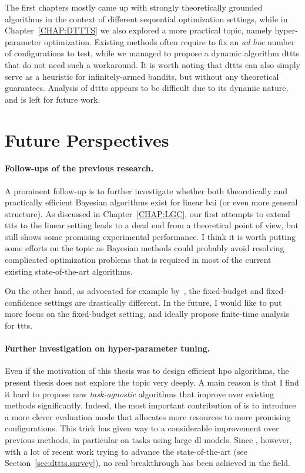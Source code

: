 The first chapters mostly came up with strongly theoretically grounded algorithms in the context of different sequential optimization settings, while in Chapter~\ref{CHAP:DTTTS} we also explored a more practical topic, namely hyper-parameter optimization. Existing methods often require to fix an \emph{ad hoc} number of configurations to test, while we managed to propose a dynamic algorithm \gls{dttts} that do not need such a workaround. It is worth noting that \gls{dttts} can also simply serve as a heuristic for \gls{infinitely-armed bandits}, but without any theoretical guarantees. Analysis of \gls{dttts} appears to be difficult due to its dynamic nature, and is left for future work.

\section{Future Perspectives}

\paragraph{Follow-ups of the previous research.} 
A prominent follow-up is to further investigate whether both theoretically and practically efficient Bayesian algorithms exist for linear \gls{bai} (or even more general structure). As discussed in Chapter~\ref{CHAP:LGC}, our first attempts to extend \gls{ttts} to the linear setting leads to a dead end from a theoretical point of view, but still shows some promising experimental performance. I think it is worth putting some efforts on the topic as Bayesian methods could probably avoid resolving complicated optimization problems that is required in most of the current existing state-of-the-art algorithms.

On the other hand, as advocated for example by~\cite{locatelli2016thresholding}, the fixed-budget and fixed-confidence settings are drastically different. In the future, I would like to put more focus on the fixed-budget setting, and ideally propose finite-time analysis for \gls{ttts}.

\paragraph{Further investigation on hyper-parameter tuning.}
Even if the motivation of this thesis was to design efficient \gls{hpo} algorithms, the present thesis does not explore the topic very deeply. A main reason is that I find it hard to propose new \emph{task-agnostic} algorithms that improve over existing methods significantly. Indeed, the most important contribution of \Hyperband{} is to introduce a more clever evaluation mode that allocates more resources to more promising configurations. This trick has given way to a considerable improvement over previous methods, in particular on tasks using large \gls{dl} models. Since \Hyperband{}, however, with a lot of recent work trying to advance the state-of-the-art (see Section~\ref{sec:dttts.survey}), no real breakthrough has been achieved in the field.

